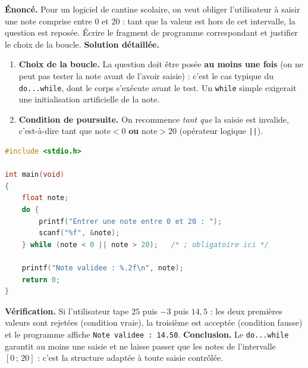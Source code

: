 \documentclass[11pt]{article}
\begin{document}
\begin{exoresolu}
\textbf{Énoncé.} Pour un logiciel de cantine scolaire, on veut obliger l'utilisateur à saisir une note comprise entre 0 et 20 : tant que la valeur est hors de cet intervalle, la question est reposée. Écrire le fragment de programme correspondant et justifier le choix de la boucle.
\tcblower
\textbf{Solution détaillée.}
\begin{enumerate}
\item \textbf{Choix de la boucle.} La question doit être posée \textbf{au moins une fois} (on ne peut pas tester la note avant de l'avoir saisie) : c'est le cas typique du \texttt{do...while}, dont le corps s'exécute avant le test. Un \texttt{while} simple exigerait une initialisation artificielle de la note.
\item \textbf{Condition de poursuite.} On recommence \emph{tant que} la saisie est invalide, c'est-à-dire tant que $\text{note} < 0$ \textbf{ou} $\text{note} > 20$ (opérateur logique \texttt{||}).
\end{enumerate}
\begin{lstlisting}[language=C]
#include <stdio.h>

int main(void)
{
    float note;
    do {
        printf("Entrer une note entre 0 et 20 : ");
        scanf("%f", &note);
    } while (note < 0 || note > 20);   /* ; obligatoire ici */

    printf("Note validee : %.2f\n", note);
    return 0;
}
\end{lstlisting}
\textbf{Vérification.} Si l'utilisateur tape $25$ puis $-3$ puis $14{,}5$ : les deux premières valeurs sont rejetées (condition vraie), la troisième est acceptée (condition fausse) et le programme affiche \texttt{Note validee : 14.50}.
\textbf{Conclusion.} Le \texttt{do...while} garantit au moins une saisie et ne laisse passer que les notes de l'intervalle $[0\,;\,20]$ : c'est la structure adaptée à toute saisie contrôlée.
\end{exoresolu}
\end{document}
